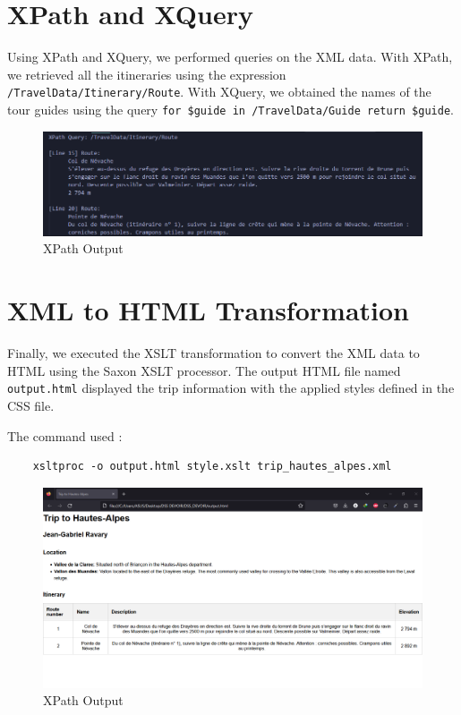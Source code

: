 \documentclass[12pt]{report}
\begin{document}
\section{XPath and XQuery}
Using XPath and XQuery, we performed queries on the XML data. With XPath, we retrieved all the itineraries using the expression \texttt{/TravelData/Itinerary/Route}. With XQuery, we obtained the names of the tour guides using the query \texttt{for \$guide in /TravelData/Guide return \$guide}.
\begin{figure}[htbp]
	\centering
	\includegraphics[width=1.0\textwidth]{xpath.png}
	\caption{XPath Output}
	\label{fig:multiple-screenshots4}
  \end{figure} 
 

\section{XML to HTML Transformation}
Finally, we executed the XSLT transformation to convert the XML data to HTML using the Saxon XSLT processor. The output HTML file named \texttt{output.html} displayed the trip information with the applied styles defined in the CSS file.

\medskip The command used :
\begin{verbatim}
	xsltproc -o output.html style.xslt trip_hautes_alpes.xml
\end{verbatim}

\begin{figure}[htbp]
	\centering
	\includegraphics[width=1.0\textwidth]{output.png}
	\caption{XPath Output}
	\label{fig:multiple-screenshots5}
  \end{figure} 
  \newpage
\end{document}
